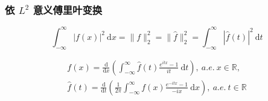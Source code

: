 \begin{frame}
\frametitle{依 $L^2$ 意义傅里叶变换}

\begin{thm}
\[
\int_{-\infty}^{\infty} |f(x)|^2 ~ \mathrm{d} x = \lVert f \rVert_2^2 = \lVert \hat{f} \rVert_2^2 = \int_{-\infty}^{\infty} |\hat{f}(t)|^2 ~ \mathrm{d} t
\]
\end{thm}

\pause

\begin{thm}[反演公式]
\begin{gather*}
f(x) = \frac{\mathrm{d}}{\mathrm{d}x} \left( \int_{-\infty}^{\infty} \hat{f}(t) \frac{e^{itx}-1}{it} ~ \mathrm{d} t \right), ~ a.e. ~ x \in \mathbb{R}, \\
\hat{f}(t) = \frac{\mathrm{d}}{\mathrm{d}t} \left( \frac{1}{2\pi} \int_{-\infty}^{\infty} f(x) \frac{e^{-itx}-1}{-ix} ~ \mathrm{d} x \right), ~ a.e. ~ t \in \mathbb{R}
\end{gather*}
\end{thm}

\end{frame}



